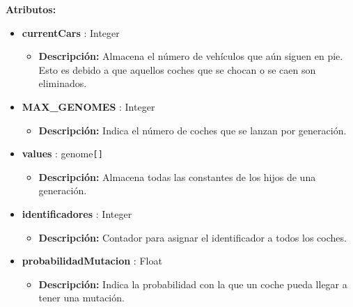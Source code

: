 \textbf{Atributos: }
\begin{itemize}
    \item \textbf{currentCars} : Integer
    \begin{itemize}
        \item \textbf{Descripción: }Almacena el número de vehículos que aún siguen en pie. Esto es debido a que aquellos coches que se chocan o se caen son eliminados.
    \end{itemize}

    \item \textbf{MAX\_GENOMES} : Integer
    \begin{itemize}
        \item \textbf{Descripción: }Indica el número de coches que se lanzan por generación.
    \end{itemize}

    \item \textbf{values} : genome\verb|[]|
    \begin{itemize}
        \item \textbf{Descripción: }Almacena todas las constantes de los hijos de una generación.
    \end{itemize}

    \item \textbf{identificadores} : Integer
    \begin{itemize}
        \item \textbf{Descripción: }Contador para asignar el identificador a todos los coches.
    \end{itemize}

    \item \textbf{probabilidadMutacion} : Float
    \begin{itemize}
        \item \textbf{Descripción: }Indica la probabilidad con la que un coche pueda llegar a tener una mutación.
    \end{itemize}

\end{itemize}